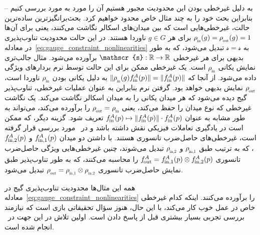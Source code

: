 به دلیل غیرخطی بودن این محدودیت مجبور هستیم آن را مورد به مورد بررسی کنیم -- بنابراین بحث خود را به چند مثال خاص محدود خواهیم کرد.
بحث‌برانگیزترین ساده‌ترین حالت، غیرخطی‌هایی است که بین میدان‌های اسکالر نگاشت می‌کنند، یعنی برای آن‌ها $\rhoin(g) = \rhoout(g) = 1$ برای هر $g \in G$ ناوردا هستند.
در این حالت محدودیت تناوب‌پذیری در معادله~\eqref{eq:gauge_constraint_nonlinearities} به $\mathscr{s} = \mathscr{s}$ تبدیل می‌شود، که به طور بدیهی برای \emph{هر} غیرخطی $\mathscr{s}: \R \to \R$ برآورده می‌شود.
مثال جالب‌تری نمایش یکانی $\rhoin$ است.
یک غیرخطی ممکن برای این حالت توسط نرم بردارهای ویژگی داده می‌شود.
از آنجا که $\lVert \rhoin(g) \fin^A(p) \rVert = \lVert \fin^A(p) \rVert$ به دلیل یکانی بودن $\rhoin$ ناوردا است، $\rhoout$ نمایش بدیهی خواهد بود.
گرفتن نرم بنابراین به عنوان عملیات غیرخطی، تناوب‌پذیر گیج دیده می‌شود که هر میدان یکانی را به میدان اسکالر نگاشت می‌کند.
یک نگاشت غیرخطی که نوع میدان را حفظ می‌کند، یعنی $\rhoout = \rhoin$ را برآورده می‌کند، می‌تواند به طور مشابه به عنوان $f_\textup{\;\!\!in}^A(p) \mapsto \lVert f_\textup{\;\!\!in}^A(p)\rVert \cdot f_\textup{\;\!\!in}^A(p)$ تعریف شود.
گزینه دیگر، که ممکن است در یادگیری تعاملات فیزیکی نقش داشته باشد و در~\cite{kondor2018ClebschGordan,Kondor2018-NBN,anderson2019cormorant,alex2020lorentz} مورد بررسی قرار گرفته است، غیرخطی‌های حاصل‌ضرب تانسوری هستند.
با داشتن دو میدان $f_\textup{\;\!\!in,1}^A(p)$ و $f_\textup{\;\!\!in,2}^A(p)$، که به ترتیب طبق
$\rho_{\overset{}{\protect\scalebox{.6}{\;\!\!\textup{in},1}}}$ و $\rho_{\overset{}{\protect\scalebox{.6}{\;\!\!\textup{in},2}}}$
تبدیل می‌شوند، چنین غیرخطی‌هایی ویژگی حاصل‌ضرب تانسوری $f_\textup{\:\!\!out}^A = f_\textup{\;\!\!in,1}^A(p) \otimes f_\textup{\;\!\!in,2}^A(p)$ را محاسبه می‌کنند، که به طور تناوب‌پذیر طبق نمایش حاصل‌ضرب تانسوری
$\rhoout = \rho_{\overset{}{\protect\scalebox{.6}{\;\!\!\textup{in},1}}} \otimes \rho_{\overset{}{\protect\scalebox{.6}{\;\!\!\textup{in},2}}}$
تبدیل می‌شود.


همه این مثال‌ها محدودیت تناوب‌پذیری گیج در معادله~\eqref{eq:gauge_constraint_nonlinearities} را برآورده می‌کنند.
اینکه کدام غیرخطی خاص در عمل خوب کار می‌کند، با این حال، هنوز سؤال تحقیقاتی بازی است که نیازمند بررسی تجربی بسیار بیشتری قبل از پاسخ دادن است.
اولین تلاش در این جهت در~\cite{Weiler2019_E2CNN} انجام شده است.
